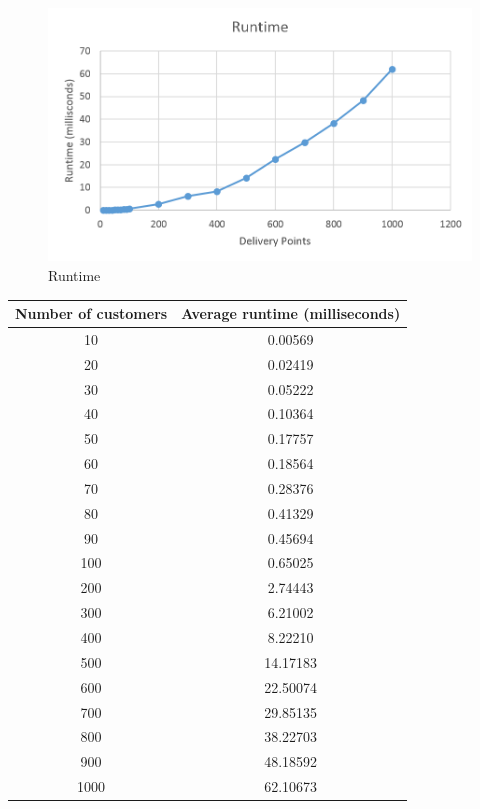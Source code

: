 \documentclass[a4paper]{article}
\begin{document}
        \begin{figure}[!h]
            \centering
            \includegraphics[width=\textwidth]{images/runtime.png}
            \caption{Runtime}
        \end{figure}
        
        \begin{minipage}{\textwidth}
            \centering
            \begin{tabular}{ c c }
                Number of customers & Average runtime (milliseconds) \\
                \hline
                \hline
                10                  &  0.00569 \\
                20                  &  0.02419 \\
                30                  &  0.05222 \\
                40                  &  0.10364 \\
                50                  &  0.17757 \\
                60                  &  0.18564 \\
                70                  &  0.28376 \\
                80                  &  0.41329 \\
                90                  &  0.45694 \\
                100                 &  0.65025 \\
                200                 &  2.74443 \\
                300                 &  6.21002 \\
                400                 &  8.22210 \\
                500                 & 14.17183 \\
                600                 & 22.50074 \\
                700                 & 29.85135 \\
                800                 & 38.22703 \\
                900                 & 48.18592 \\
                1000                & 62.10673 \\
                \hline
            \end{tabular}
        \end{minipage}
        
\end{document}
